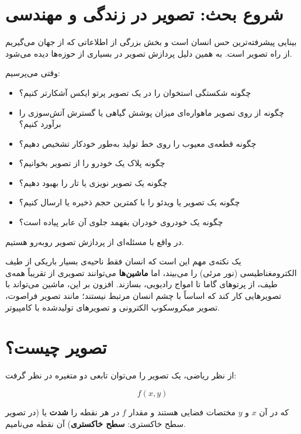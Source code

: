 \documentclass[11pt,a4paper]{article}
\begin{document}
	
	\section{شروع بحث: تصویر در زندگی و مهندسی}
	
	بینایی پیشرفته‌ترین حس انسان است و بخش بزرگی از اطلاعاتی که از جهان می‌گیریم از راه
	تصویر است. به همین دلیل پردازش تصویر در بسیاری از حوزه‌ها دیده می‌شود.
	
	وقتی می‌پرسیم:
	
	\begin{itemize}
		\item چگونه شکستگی استخوان را در یک تصویر پرتو ایکس آشکارتر کنیم؟
		\item چگونه از روی تصویر ماهواره‌ای میزان پوشش گیاهی یا گسترش آتش‌سوزی را برآورد کنیم؟
		\item چگونه قطعه‌ی معیوب را روی خط تولید به‌طور خودکار تشخیص دهیم؟
		\item چگونه پلاک یک خودرو را از تصویر بخوانیم؟
		\item چگونه یک تصویر نویزی یا تار را بهبود دهیم؟
		\item چگونه یک تصویر یا ویدئو را با کمترین حجم ذخیره یا ارسال کنیم؟
		\item چگونه یک خودروی خودران بفهمد جلوی آن عابر پیاده است؟
	\end{itemize}
	
	در واقع با مسئله‌ای از پردازش تصویر روبه‌رو هستیم.
	
	یک نکته‌ی مهم این است که انسان فقط ناحیه‌ی بسیار باریکی از طیف الکترومغناطیسی
	(نور مرئی) را می‌بیند، اما \textbf{ماشین‌ها} می‌توانند تصویری از تقریباً همه‌ی طیف،
	از پرتوهای گاما تا امواج رادیویی، بسازند. افزون بر این، ماشین می‌تواند با تصویرهایی کار کند که
	اساساً با چشم انسان مرتبط نیستند؛ مانند تصویر فراصوت، تصویر میکروسکوپ الکترونی
	و تصویرهای تولیدشده با کامپیوتر.
	
	
	\section{تصویر چیست؟}
	
	از نظر ریاضی، یک تصویر را می‌توان تابعی دو متغیره در نظر گرفت:
	
	\[
	f(x,y)
	\]
	
	که در آن $x$ و $y$ مختصات فضایی هستند و مقدار $f$ در هر نقطه را
	\textbf{شدت} یا  (در تصویر سطح خاکستری: \textbf{سطح خاکستری}) آن نقطه می‌نامیم.
	
\end{document}
